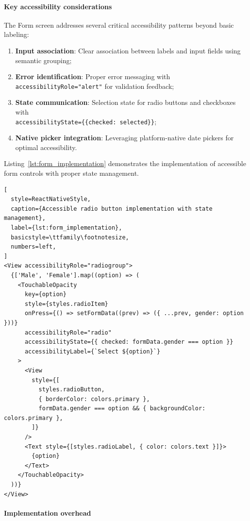 \paragraph{Key accessibility considerations}

The Form screen addresses several critical accessibility patterns beyond basic labeling:

\begin{enumerate}
    \item \textbf{Input association}: Clear association between labels and input fields using semantic grouping;
    
    \item \textbf{Error identification}: Proper error messaging with \texttt{accessibilityRole="alert"} for validation feedback;
    
    \item \textbf{State communication}: Selection state for radio buttons and checkboxes with \\ \texttt{accessibilityState=\{\{checked: selected\}\}};
    
    \item \textbf{Native picker integration}: Leveraging platform-native date pickers for optimal accessibility.
\end{enumerate}

Listing~\ref{lst:form_implementation} demonstrates the implementation of accessible form controls with proper state management.

\begin{lstlisting}[
  style=ReactNativeStyle,
  caption={Accessible radio button implementation with state management},
  label={lst:form_implementation},
  basicstyle=\ttfamily\footnotesize,
  numbers=left,
]
<View accessibilityRole="radiogroup">
  {['Male', 'Female'].map((option) => (
    <TouchableOpacity
      key={option}
      style={styles.radioItem}
      onPress={() => setFormData((prev) => ({ ...prev, gender: option }))}
      accessibilityRole="radio"
      accessibilityState={{ checked: formData.gender === option }}
      accessibilityLabel={`Select ${option}`}
    >
      <View
        style={[
          styles.radioButton,
          { borderColor: colors.primary },
          formData.gender === option && { backgroundColor: colors.primary },
        ]}
      />
      <Text style={[styles.radioLabel, { color: colors.text }]}>
        {option}
      </Text>
    </TouchableOpacity>
  ))}
</View>
\end{lstlisting}

\paragraph{Implementation overhead}


